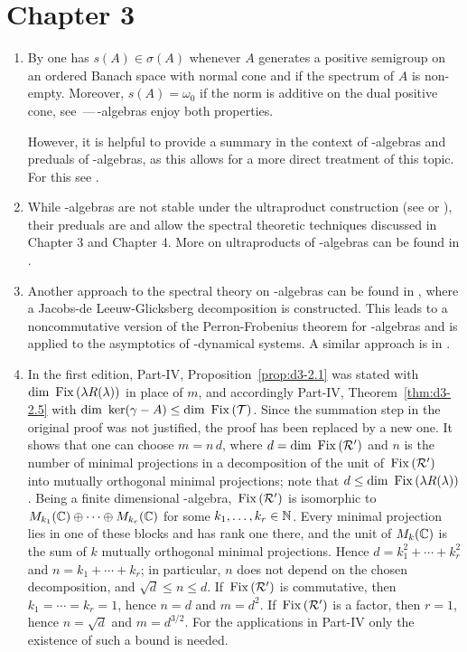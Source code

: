 \section*{Chapter 3}
\begin{enumerate}
\item 
By \textcite[Theorem 5.3.1]{zbmath03736445} one has $s(A) \in \sigma(A)$ whenever $A$ generates a positive semigroup on an ordered Banach space with normal cone and if the spectrum of $A$ is non-empty.
Moreover, $s(A) = \omega_{0}$ if the norm is additive on the dual positive cone, see \textcite[Theorem 2.4.4]{zbmath03883065}\,---\,\CA-algebras enjoy both properties.

However, it is helpful to provide a summary in the context of \CA-algebras and preduals of \WA-algebras, as this allows for a more direct treatment of this topic.
For this see \textcite{groh:2026}.


\item 
While \WA-algebras are not stable under the ultraproduct construction (see \textcite[p. 79]{zbmath03640303} or \textcite{zbmath03467832}), their preduals are and allow the spectral theoretic techniques discussed in Chapter 3 and Chapter 4.
More on ultraproducts of \WA-algebras can be found in \textcite{zbmath06326930}.

\item 
Another approach to the spectral theory on \WA-algebras can be found in \textcite{zbmath06031834}, where a Jacobs-de Leeuw-Glicksberg decomposition is constructed.
This leads to a noncommutative version of the Perron-Frobenius theorem for \WA-algebras and is applied to the asymptotics of \WA-dynamical systems.
A similar approach is in \textcite{zbmath06728793}.

\item
In the first edition, Part-IV, Proposition~\ref{prop:d3-2.1} was stated with $\mathop{}\!\mathrm{dim}\, \mathop{}\mathrm{Fix}\left(\lambda R(\lambda)\right)$ in place of $m$, and accordingly Part-IV, Theorem~\ref{thm:d3-2.5} with $\dim \Kern{\gamma - A} \leq \dim \Fix{\TT}$.
Since the summation step in the original proof was not justified, the proof has been replaced by a new one.
It shows that one can choose $m = n\,d$, where $d = \mathop{}\!\mathrm{dim}\, \mathop{}\mathrm{Fix}\left(\mathcal{R}'\right)$ and $n$ is the number of minimal projections in a decomposition of the unit of\/ $\mathop{}\mathrm{Fix}\left(\mathcal{R}'\right)$ into mutually orthogonal minimal projections; note that $d \leq \dim \Fix{\lambda R(\lambda)}$.
Being a finite dimensional \WA-algebra, $\mathop{}\mathrm{Fix}\left(\mathcal{R}'\right)$ is isomorphic to $M_{k_{1}}(\mathbb{C}) \oplus \cdots \oplus M_{k_{r}}(\mathbb{C})$ for some $k_{1}, \ldots, k_{r} \in \mathbb{N}$.
Every minimal projection lies in one of these blocks and has rank one there, and the unit of\/ $M_{k}(\mathbb{C})$ is the sum of $k$ mutually orthogonal minimal projections.
Hence $d = k_{1}^{2} + \cdots + k_{r}^{2}$ and $n = k_{1} + \cdots + k_{r}$; in particular, $n$ does not depend on the chosen decomposition, and $\sqrt{d} \leq n \leq d$.
If\/ $\mathop{}\mathrm{Fix}\left(\mathcal{R}'\right)$ is commutative, then $k_{1} = \cdots = k_{r} = 1$, hence $n = d$ and $m = d^{2}$.
If\/ $\mathop{}\mathrm{Fix}\left(\mathcal{R}'\right)$ is a factor, then $r = 1$, hence $n = \sqrt{d}$ and $m = d^{3/2}$.
For the applications in Part-IV only the existence of such a bound is needed.


\end{enumerate}
